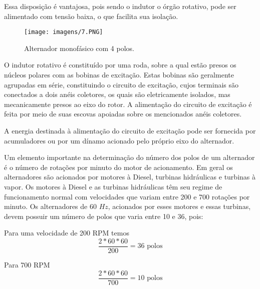 Essa disposição é vantajosa, pois sendo o indutor o órgão rotativo, pode ser alimentado com tensão baixa, o que facilita sua isolação.

\begin{figure}[ht!]
\center 
\texttt{[image: imagens/7.PNG]}
\caption{Alternador monofásico com 4 polos.}
\end{figure}

O indutor rotativo é constituído por uma roda, sobre a qual estão presos os núcleos polares com as bobinas de excitação. Estas bobinas são geralmente agrupadas em série, constituindo o circuito de excitação, cujos terminais são conectados a dois anéis coletores, os quais são eletricamente isolados, mas mecanicamente presos ao eixo do rotor. A alimentação do circuito de excitação é feita por meio de suas escovas apoiadas sobre os mencionados anéis coletores.

A energia destinada à alimentação do circuito de excitação pode ser fornecida por acumuladores ou por um dínamo acionado pelo próprio eixo do alternador.

Um elemento importante na determinação do número dos polos de um alternador é o número de rotações por minuto do motor de acionamento. Em geral os alternadores são acionados por motores à Diesel, turbinas hidráulicas e turbinas à vapor. Os motores à Diesel e as turbinas hidráulicas têm seu regime de funcionamento normal com velocidades que variam entre 200 e 700 rotações por minuto. Os alternadores de 60 $Hz$, acionados por esses motores e essas turbinas, devem possuir um número de polos que varia entre 10 e 36, pois:

Para uma velocidade de 200 RPM temos
$$\frac{2*60*60}{200} = 36 \text{ polos}$$

Para 700 RPM
$$\frac{2*60*60}{700} = 10 \text{ polos}$$

